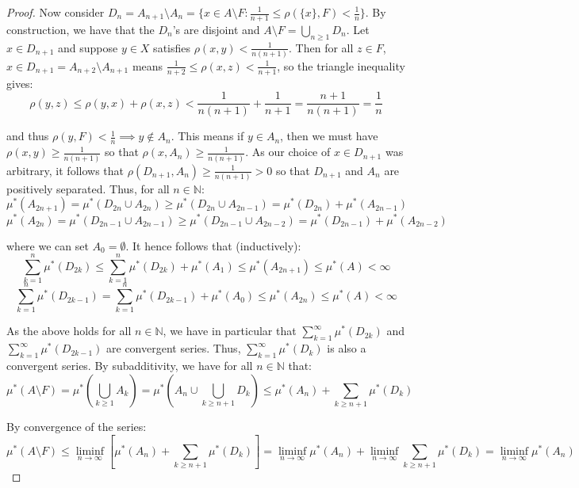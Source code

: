 \documentclass{article}[11pt]
\newcommand*{\N}{\mathbb{N}}
\theoremstyle{dotless}
\begin{document}
\begin{proof}
	\noindent
	Now consider $D_n = A_{n+1} \setminus A_n = \{ x \in A \setminus F : \frac{1}{n+1} \leqslant \rho(\{x\}, F) < \frac{1}{n} \}$.
	By construction, we have that the $D_n$'s are disjoint and $A \setminus F = \bigcup_{n \geqslant 1} D_n$.
	Let $x \in D_{n+1}$ and suppose $y \in X$ satisfies $\rho(x,y) < \frac{1}{n(n+1)}$. Then for all $z \in F$, $x \in D_{n+1} = A_{n+2} \setminus
	A_{n+1}$ means $\frac{1}{n+2} \leqslant \rho(x,z) < \frac{1}{n+1}$, so the triangle inequality gives:
	\[ \rho(y,z) \leqslant \rho(y,x) + \rho(x,z) < \frac{1}{n(n+1)} + \frac{1}{n+1} = \frac{n+1}{n(n+1)} = \frac{1}{n} \]
	
	\noindent
	and thus $\rho(y,F) < \frac{1}{n} \implies y \not\in A_n$. This means if $y \in A_n$, then we must have
	$\rho(x,y) \geqslant \frac{1}{n(n+1)}$ so that $\rho(x, A_n) \geqslant \frac{1}{n(n+1)}$. As our choice of $x \in D_{n+1}$ was arbitrary,
	it follows that $\rho(D_{n+1}, A_n) \geqslant \frac{1}{n(n+1)} > 0$ so that $D_{n+1}$ and $A_n$ are positively separated.
	Thus, for all $n \in \N$:
	\[ \mu^*(A_{2n+1}) = \mu^*(D_{2n} \cup A_{2n}) \geqslant \mu^*(D_{2n} \cup A_{2n-1})
	= \mu^*(D_{2n}) + \mu^*(A_{2n-1}) \]
	\[ \mu^*(A_{2n}) = \mu^*(D_{2n-1} \cup A_{2n-1}) \geqslant \mu^*(D_{2n-1} \cup A_{2n-2})
	= \mu^*(D_{2n-1}) + \mu^*(A_{2n-2}) \]
	
	\noindent
	where we can set $A_0 = \emptyset$. It hence follows that (inductively):
	\[ \sum_{k=1}^n \mu^*(D_{2k}) \leqslant \sum_{k=1}^n \mu^*(D_{2k}) + \mu^*(A_1) \leqslant \mu^*(A_{2n+1})
	\leqslant \mu^*(A) < \infty \]
	\[ \sum_{k=1}^n \mu^*(D_{2k-1}) = \sum_{k=1}^n \mu^*(D_{2k-1}) + \mu^*(A_0) \leqslant \mu^*(A_{2n})
	\leqslant \mu^*(A) < \infty \]
	
	\noindent
	As the above holds for all $n \in \N$, we have in particular that $\sum_{k=1}^\infty \mu^*(D_{2k})$
	and $\sum_{k=1}^\infty \mu^*(D_{2k-1})$ are convergent series. Thus, $\sum_{k=1}^\infty \mu^*(D_k)$ is also a
	convergent series. By subadditivity, we have for all $n \in \N$ that:
	\[ \mu^*(A \setminus F) = \mu^*\left( \bigcup_{k \geqslant 1} A_k \right)
	= \mu^*\left( A_n \cup \bigcup_{k \geqslant n+1} D_k \right)
	\leqslant \mu^*(A_n) +  \sum_{k \geqslant n+1} \mu^*(D_k) \]
	
	\noindent
	By convergence of the series:
	\[ \mu^*(A \setminus F) \leqslant \liminf_{n \to \infty} \left[ \mu^*(A_n) +  \sum_{k \geqslant n+1} \mu^*(D_k) \right]
	= \liminf_{n \to \infty} \mu^*(A_n) + \liminf_{n \to \infty} \sum_{k \geqslant n+1} \mu^*(D_k)
	= \liminf_{n \to \infty} \mu^*(A_n) \]
	

\end{proof}
\end{document}
